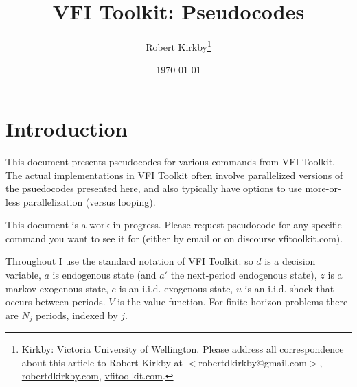 \documentclass[11pt,fleqn]{article}
\begin{document}
\newcommand{\rob}[1]{{\noindent\color{blue}\bf #1}}
\newcommand{\robc}[1]{{\noindent\color{blue}\bf R: #1}}

\title{VFI Toolkit: Pseudocodes}
\author{Robert Kirkby\thanks{Kirkby: Victoria University of Wellington.
Please address all correspondence about this article to Robert Kirkby at $<$robertdkirkby@gmail.com$>$,
\href{http://www.robertdkirkby.com}{robertdkirkby.com}, \href{http://www.vfitoolkit.com}{vfitoolkit.com}.
}} %
\date{\today}
\maketitle



\thispagestyle{empty}

\newpage
{
\small
\parskip=0cm
\parindent=0cm
\tableofcontents
}


\newpage
\baselineskip=17pt
\setcounter{page}{1}

\section{Introduction}
This document presents pseudocodes for various commands from VFI Toolkit. The actual implementations in VFI Toolkit often involve parallelized versions of the psuedocodes presented here, and also typically have options to use more-or-less parallelization (versus looping).

This document is a work-in-progress. Please request pseudocode for any specific command you want to see it for (either by email or on discourse.vfitoolkit.com).

Throughout I use the standard notation of VFI Toolkit: so $d$ is a decision variable, $a$ is endogenous state (and $a'$ the next-period endogenous state), $z$ is a markov exogenous state, $e$ is an i.i.d. exogenous state, $u$ is an i.i.d. shock that occurs between periods. $V$ is the value function. For finite horizon problems there are $N_j$ periods, indexed by $j$.
\end{document}
